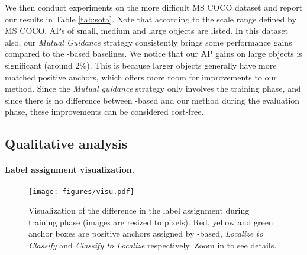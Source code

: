 \documentclass[runningheads]{llncs}
\begin{document}
We then conduct experiments on the more difficult MS COCO \cite{COCO} dataset and report our results in Table \ref{tab:sota}.
Note that according to the scale range defined by MS COCO, APs of small, medium and large objects are listed. In this dataset also, our \emph{Mutual Guidance} strategy consistently brings some performance gains compared to the -based baselines. We notice that our AP gains on large objects is significant (around 2\%). This is because larger objects generally have more matched positive anchors, which offers more room for improvements to our method. Since the \emph{Mutual guidance} strategy only involves the training phase, and since there is no difference between -based and our method during the evaluation phase, these improvements can be considered cost-free.

\subsection{Qualitative analysis}

\paragraph{Label assignment visualization.}

\begin{figure}[t]
\begin{center}
\texttt{[image: figures/visu.pdf]}
\end{center}
   \caption{Visualization of the difference in the label assignment during training phase (images are resized to  pixels). Red, yellow and green anchor boxes are positive anchors assigned by -based, \emph{Localize to Classify} and \emph{Classify to Localize} respectively. Zoom in to see details.}
\label{fig:visu}
\end{figure}
\end{document}
